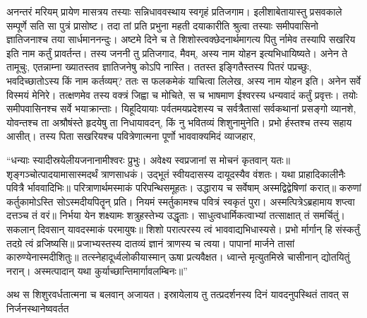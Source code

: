 \vakya अनन्तरं मरियम् प्रायेण मासत्रय तस्याः सन्निधाववस्थाय स्वगृहं प्रतिजगाम।
\vakya इलीशाबेतायास्तु प्रसवकाले सम्पूर्णे सति सा पुत्रं प्रासोष्ट।
\vakya तदा तां प्रति प्रभुना महती दयाकारीति श्रुत्वा तस्याः समीपवासिनो ज्ञातिजनाश्च तया सार्धमाननन्दुः।
\vakya अष्टमे दिने च ते शिशोस्त्वक्छेदनार्थमागत्य पितु र्नामेव तस्यापि सखरिय इति नाम कर्तुं प्रावर्तन्त।
\vakya तस्य जननी तु प्रतिजगाद, मैवम्, अस्य नाम योहन इत्यभिधायिष्यते।
\vakya अनेन ते तामूचुः, एतन्नाम्ना ख्यातस्तव ज्ञातिजनेषु कोऽपि नास्ति।
\vakya ततस्त इङ्गितैस्तस्य पितरं पप्रच्छुः, भवदिच्छातोऽस्य किं नाम कर्तव्यम्?
\vakya ततः स फलकमेकं याचित्वा लिलेख, अस्य नाम योहन इति। अनेन सर्वे विस्मयं मेनिरे।
\vakya तत्क्षणमेव तस्य वक्त्रं जिह्वा च मोचिते, स च भाषमाण ईश्वरस्य धन्यवादं कर्तुं प्रवृत्तः।
\vakya तयोः समीपवासिनश्च सर्वे भयाक्रान्ताः।
\vakya यिहूदियायाः पर्वतमयप्रदेशस्य च सर्वत्रैतासां सर्वकथानां प्रसङ्गो व्यानशे, योवन्तश्च ता अश्रौषंस्ते हृदयेषु ता निधायावदन्, किं नु भवितव्यं शिशुनामुनेति। प्रभो र्हस्तश्च तस्य सहाय आसीत्।
\vakya तस्य पिता सखरियश्च पवित्रेणात्मना पूर्णो भाववाक्यमिदं व्याजहार,
\begin{poem}
\startwithvakya “धन्याः स्यादीस्रयेलीयजनानामीश्वरः प्रुभुः।
\pline अवेक्ष्य स्वप्रजानां स मोचनं कृतवान् यतः॥
\vakya शृङ्गञ्चोत्पादयामासास्मदर्थं त्राणसाधकं।
\pline उद्भूतं स्वीयदासस्य दायूदस्यैव वंशतः।
\vakya यथा प्राहादिकालीनैः पवित्रै र्भाववादिभिः॥
\pline परित्राणार्थमस्माकं परिपन्थिसमूहतः।
\vakya उद्धाराय च सर्वेषाम् अस्मद्विद्वेषिणां करात्॥
\vakya करुणां कर्तुकामोऽस्ति सोऽस्मदीयपितॄन् प्रति।
\pline नियमं स्मर्तुकामश्च पवित्रं स्वकृतं पुरा।
\vakya अस्मत्पित्रेऽब्रहामाय शप्त्वा दत्तञ्च तं वरं॥
\vakya निर्भया येन शक्ष्यामः शत्रुहस्तेभ्य उद्धृताः।
\vakya साधुत्वधार्मिकत्वाभ्यां तत्साक्षात् तं समर्चितुं।
\pline सकलान् दिवसान् यावदस्माकं परमायुषः॥
\vakya शिशो परात्परस्य त्वं भाववाद्यभिधास्यसे।
\pline प्रभो र्मार्गान् हि संस्कर्तुं तदग्रे त्वं व्रजिष्यसि॥
\vakya प्रजाभ्यस्तस्य दातव्यं ज्ञानं त्राणस्य च त्वया।
\pline पापानां मार्जने तासां कारुण्येनास्मदीशितुः॥
\vakya तत्स्नेहादूर्ध्वलोकीयास्मान् ऊषा प्रत्यवैक्षत।
\vakya ध्वान्ते मृत्युतमिस्रे चासीनान् द्योतयितुं नरान्।
\pline अस्मत्पादान् यथा कुर्याच्छान्तिमार्गावलम्बिनः॥”
\end{poem}
\vakya अथ स शिशुरवर्धतात्मना च बलवान् अजायत। इस्रायेलाय तु तत्प्रदर्शनस्य दिनं यावदनुपस्थितं तावत् स निर्जनस्थानेष्ववर्तत\eoc